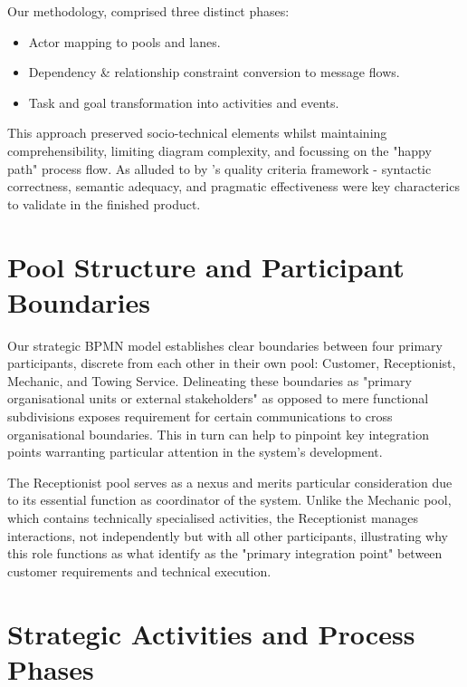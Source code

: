 \documentclass[14pt,a4paper]{article}
\begin{document}
\vspace{0.7em}
Our methodology, comprised three distinct phases:

\begin{itemize}
  \item Actor mapping to pools and lanes.
  \item Dependency \& relationship constraint conversion to message flows.
  \item Task and goal transformation into activities and events.
\end{itemize}

This approach preserved socio-technical elements whilst maintaining comprehensibility, limiting diagram complexity, and focussing on the "happy path" process flow. As alluded to by \textcite[p. 136]{Corradini2018}'s quality criteria framework - syntactic correctness, semantic adequacy, and pragmatic effectiveness were key characterics to validate in the finished product.

\section{Pool Structure and Participant Boundaries}

Our strategic BPMN model establishes clear boundaries between four primary participants, discrete from each other in their own pool: Customer, Receptionist, Mechanic, and Towing Service. Delineating these boundaries as "primary organisational units or external stakeholders" \textcite[p. 103]{Kluza2017} as opposed to mere functional subdivisions exposes requirement for certain communications to cross organisational boundaries. This in turn can help to pinpoint key integration points warranting particular attention in the system's development.

The Receptionist pool serves as a nexus and merits particular consideration due to its essential function as coordinator of the system. Unlike the Mechanic pool, which contains technically specialised activities, the Receptionist manages interactions, not independently but with all other participants, illustrating why this role functions as what \textcite[p. 48]{Gorton2017} identify as the "primary integration point" between customer requirements and technical execution.

\section{Strategic Activities and Process Phases}
\end{document}
